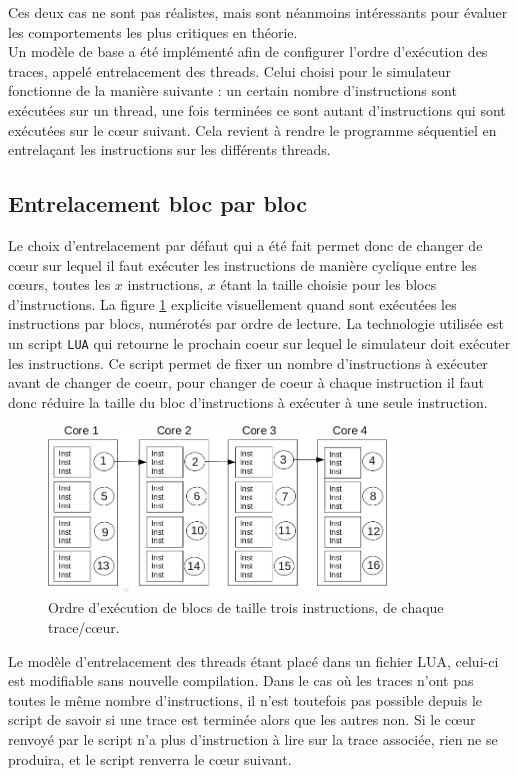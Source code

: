 Ces deux cas ne sont pas réalistes, mais sont néanmoins intéressants pour évaluer les comportements les plus critiques en théorie.\\


Un modèle de base a été implémenté afin de configurer l'ordre d'exécution des traces, appelé entrelacement des threads. Celui choisi pour le simulateur fonctionne de la manière suivante : un certain nombre d'instructions sont exécutées sur un thread, une fois terminées ce sont autant d'instructions qui sont exécutées sur le c\oe ur suivant. Cela revient à rendre le programme  séquentiel en entrelaçant les instructions sur les différents threads.

\subsection{Entrelacement bloc par bloc}

Le choix d'entrelacement par défaut qui a été fait permet donc de changer de c\oe ur sur lequel il faut exécuter les instructions de manière cyclique entre les c\oe urs, toutes les $x$ instructions, $x$ étant la taille choisie pour les blocs d'instructions. La figure \ref{img:entrelacement} explicite visuellement quand sont exécutées les instructions par blocs, numérotés par ordre de lecture. La technologie utilisée est un script \texttt{LUA} qui retourne le prochain coeur sur lequel le simulateur doit exécuter les instructions. Ce script permet de fixer un nombre d'instructions à exécuter avant de changer de coeur, pour changer de coeur à chaque instruction il faut donc réduire la taille du bloc d'instructions à exécuter à une seule instruction.\\

\begin{figure}[!h]
\begin{center}
   \includegraphics[width=0.8\textwidth]{images/entrelacement.png}
   \caption{\label{img:entrelacement} Ordre d'exécution de blocs de taille trois instructions, de chaque trace/c\oe ur.}
\end{center}
\end{figure}



Le modèle d'entrelacement des threads étant placé dans un fichier LUA, celui-ci est modifiable sans nouvelle compilation. Dans le cas où les traces n'ont pas toutes le même nombre d'instructions, il n'est toutefois pas possible depuis le script de savoir si une trace est terminée alors que les autres non. Si le c\oe ur renvoyé par le script n'a plus d'instruction à lire sur la trace associée, rien ne se produira, et le script renverra le c\oe ur suivant. 

